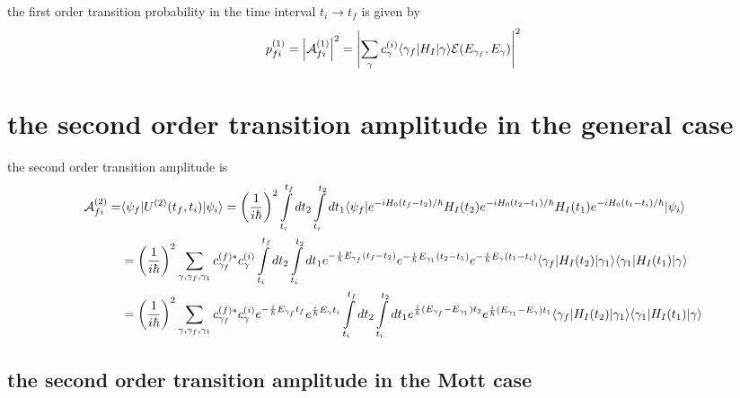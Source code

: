 the first order transition probability in the time interval $t_i\rightarrow t_f$ is given by
\begin{align}
    p_{fi}^{(1)} = \left| \mathcal{A}_{fi}^{(1)} \right|^2 = \left|\sum_\gamma {c_\gamma^{(i)}}\langle \gamma_f|H_I|\gamma\rangle   {\cal E}(E_{\gamma_f},E_{\gamma})\right|^2\label{eq:gen-first-order-probability}
\end{align}
\newpage
\section{the second order transition amplitude in the general case}
the second order transition amplitude is
\begin{align}
    {\cal A}_{fi}^{(2)} = & \langle \psi_f | U^{(2)}(t_f,t_i) | \psi_i \rangle = \left(\frac{1}{i\hbar}\right)^2 \int\limits_{t_i}^{t_f}dt_2 \int\limits_{t_i}^{t_2}dt_1 \langle \psi_f | e^{-iH_0(t_f-t_2)/\hbar} H_I(t_2) e^{-iH_0(t_2-t_1)/\hbar} H_I(t_1) e^{-iH_0(t_1-t_i)/\hbar} | \psi_i \rangle\nonumber                                                                                                                        \\
    & = \left(\frac{1}{i\hbar}\right)^2 \sum\limits_{\gamma,\gamma_f,\gamma_1}c_{\gamma_f}^{(f)*} c_{\gamma}^{(i)}\int\limits_{t_i}^{t_f}dt_2\int\limits_{t_i}^{t_2}dt_1e^{-\frac{i}{\hbar}E_{\gamma_f} (t_f-t_2)}e^{-\frac{i}{\hbar}E_{\gamma_1}(t_2-t_1)}e^{-\frac{i}{\hbar}E_{\gamma}(t_1-t_i)}\langle \gamma_f |H_I(t_2)| \gamma_1\rangle\langle \gamma_1 |H_I(t_1)| \gamma\rangle\nonumber                                  \\
    & =\left(\frac{1}{i\hbar}\right)^2 \sum\limits_{\gamma,\gamma_f,\gamma_1}c_{\gamma_f}^{(f)*} c_{\gamma}^{(i)}e^{-\frac{i}{\hbar}E_{\gamma_f} t_f}e^{\frac{i}{\hbar}E_{\gamma} t_i}\int\limits_{t_i}^{t_f}dt_2\int\limits_{t_i}^{t_2}dt_1e^{\frac{i}{\hbar}(E_{\gamma_f}-E_{\gamma_1})t_2}e^{\frac{i}{\hbar}(E_{\gamma_1}-E_{\gamma})t_1}\langle \gamma_f |H_I(t_2)| \gamma_1\rangle\langle \gamma_1 |H_I(t_1)| \gamma\rangle
\end{align}

\subsection{the second order transition amplitude in the Mott case}

